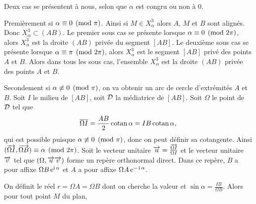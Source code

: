 Deux cas se présentent à nous, selon que \(\alpha\) est congru ou non à 0.

Premièrement si \(\alpha \equiv 0 \pmod {\pi}\). Ainsi si \(M \in X_\alpha^3\) alors \(A\), \(M\) et \(B\) sont alignés. Donc \(X_\alpha^3 \subset (AB)\). Le premier sous cas se présente lorsque \(\alpha \equiv 0 \pmod {2\pi}\), alors \(X_\alpha^3\) est la droite \((AB)\) privée du segment \([AB]\). Le deuxième sous cas se présente lorsque \(\alpha \equiv \pi \pmod {2\pi}\), alors  \(X_\alpha^3\) est le segment \([AB]\) privé des points \(A\) et \(B\).  Alors dans tous les sous cas, l'ensemble \(X_\alpha^3\) est la droite \((AB)\) privée des points \(A\) et \(B\).

Secondement si  \(\alpha \not\equiv 0 \pmod {\pi}\), on va obtenir un arc de cercle d'extrémités \(A\) et \(B\). Soit \(I\) le milieu de \([AB]\), soit \(\mathcal{D}\) la médiatrice de \([AB]\). Soit \(\Omega\) le point de \(\mathcal{D}\) tel que
\begin{equation}
  \overline{\Omega I}=\frac{AB}{2}\operatorname{cotan} \alpha=IB \operatorname{cotan} \alpha,
\end{equation}
qui est possible puisque \(\alpha \not\equiv 0 \pmod {\pi}\), donc on peut définir sa cotangente. Ainsi \((\overrightarrow{\Omega I},\overrightarrow{\Omega B}) \equiv \alpha \pmod {2\pi}\). Soit le vecteur unitaire \(\overrightarrow{u}=\frac{\overrightarrow{\Omega I}}{\Omega I}\) et le vecteur unitaire \(\overrightarrow{v}\) tel que \((\Omega, \overrightarrow{u} \overrightarrow{v})\) forme un repère orthonormal direct. Dans ce repère, \(B\) a pour affixe \(\Omega B \operatorname{e}^{\operatorname{i} \alpha}\) et \(A\) a pour affixe \(\Omega A \operatorname{e}^{-\operatorname{i} \alpha}\).

On définit le réel \(r=\Omega A=\Omega B\) dont on cherche la valeur et \(\sin \alpha = \frac{IB}{\Omega B}\). Alors pour tout point \(M\) du plan,

